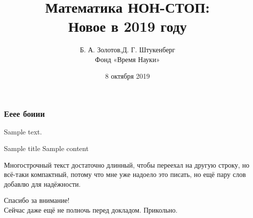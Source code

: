 \documentclass[aspectratio=1610,12pt,notheorems]{beamer}
\title[Mathnonstop 2019: the seminar]
    {\bfseries Математика НОН-СТОП: \\
	Новое в 2019 году}
\author[\ ]
	{Б. А. Золотов,\qquad Д. Г. Штукенберг \\ \vspace{0.3cm}
		{\small Фонд «Время Науки»}}
\institute[\ ]{\ }
\date{8 октября 2019}
\theoremstyle{plain}
\theoremstyle{definition}
\def\ps{\\ [0.65cm]} \linespread{1.16}
\begin{document}
\frame{\titlepage}

\begin{frame}
\frametitle{Ееее боиии}
	Sample text.

\begin{block}{Sample title}
	Sample content
\end{block}

	Многострочный текст достаточно длинный, чтобы переехал на другую строку, но всё-таки компактный, потому что мне уже надоело это писать, но ещё пару слов добавлю для надёжности.
\end{frame}

\begin{frame} \begin{center}
	\Huge{Спасибо за внимание!} \ps
	\small{Сейчас даже ещё не полночь перед докладом. Прикольно.}
\end{center} \end{frame}
\end{document}
